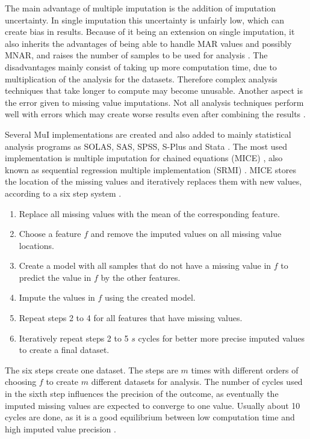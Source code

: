 \documentclass[10pt,a4paper]{report}
\begin{document}
	The main advantage of multiple imputation is the addition of imputation uncertainty. In single imputation this uncertainty is unfairly low, which can create bias in results. Because of it being an extension on single imputation, it also inherits the advantages of being able to handle MAR values and possibly MNAR, and raises the number of samples to be used for analysis \cite{van2006imputation, pedersen2017missing}. The disadvantages mainly consist of taking up more computation time, due to multiplication of the analysis for the datasets. Therefore complex analysis techniques that take longer to compute may become unusable. Another aspect is the error given to missing value imputations. Not all analysis techniques perform well with errors which may create worse results even after combining the results \cite{pedersen2017missing}.
	
	Several MuI implementations are created and also added to mainly statistical analysis programs as SOLAS, SAS, SPSS, S-Plus and Stata \cite{horton2001multiple, allison2000multiple, royston2011multiple}. The most used implementation is multiple imputation for chained equations (MICE) \cite{azur2011multiple, royston2004multiple}, also known as sequential regression multiple implementation (SRMI) \cite{he2010multiple}. MICE stores the location of the missing values and iteratively replaces them with new values, according to a six step system \cite{azur2011multiple}. 
	
	\begin{enumerate}
		\item Replace all missing values with the mean of the corresponding feature.
		\item Choose a feature $f$ and remove the imputed values on all missing value locations.
		\item Create a model with all samples that do not have a missing value in $f$ to predict the value in $f$ by the other features.
		\item Impute the values in $f$ using the created model.
		\item Repeat steps 2 to 4 for all features that have missing values.
		\item Iteratively repeat steps 2 to 5 $s$ cycles for better more precise imputed values to create a final dataset.
	\end{enumerate}
	
	The six steps create one dataset. The steps are $m$ times with different orders of choosing $f$ to create $m$ different datasets for analysis. The number of cycles used in the sixth step influences the precision of the outcome, as eventually the imputed missing values are expected to converge to one value. Usually about 10 cycles are done, as it is a good equilibrium between low computation time and high imputed value precision \cite{azur2011multiple, royston2004multiple}.
	
\end{document}
